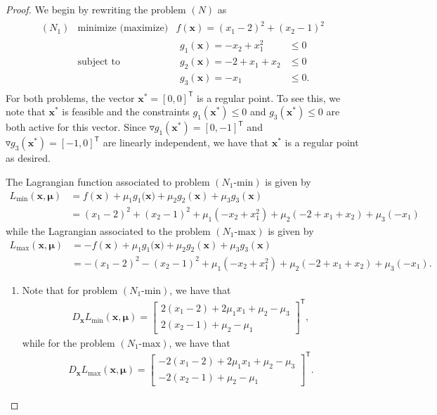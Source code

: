 \documentclass[12pt]{article}
\theoremstyle{definition}
\newcommand{\vc}[1]{\boldsymbol{#1}}
\newcommand{\tran}{\mathsf{T}}
\begin{document}
\begin{proof}
  We begin by rewriting the problem $(N)$ as
  \begin{align*}
    \begin{array}{rll}
      (N_1) & \text{minimize $($maximize$)$} & f(\vc{x}) =(x_1 - 2)^2 + (x_2 -1)^2 \\
      & \text{subject to} &
      \begin{array}{ll}
        g_1(\vc{x}) = -x_2 + x_1^2 &\leq 0\\
        g_2(\vc{x}) = -2 + x_1 + x_2 &\leq 0 \\
        g_3(\vc{x}) = -x_1 &\leq 0.
      \end{array}
    \end{array}
  \end{align*}
  For both problems, the vector $\vc{x}^*=[0,0]^\tran$ is a regular point. To see this, we note that
  $\vc{x}^*$ is feasible and the constraints $g_1(\vc{x}^*)\leq 0$ and $g_3(\vc{x}^*) \leq 0$ are both active for this vector. Since
  $\triangledown g_1(\vc{x}^*) = [0,-1]^\tran$ and $\triangledown g_3(\vc{x}^*) = [-1,0]^\tran$ are linearly independent,
  we have that $\vc{x}^*$ is a regular point as desired.

  The Lagrangian function associated to problem $(N_1\text{-min})$ is given by
  \begin{align*}
    L_{\min}(\vc{x}, \vc{\mu}) &= f(\vc{x}) + \mu_1g_1(\vc{x)} + \mu_2 g_2(\vc{x}) +\mu_3 g_3(\vc{x})\\
    &= (x_1 - 2)^2 + (x_2 -1)^2 + \mu_1(-x_2 + x_1^2) + \mu_2(-2 + x_1 + x_2) + \mu_3(-x_1)
  \end{align*}
  while the Lagrangian associated to the problem $(N_1\text{-max})$ is given by
  \begin{align*}
    L_{\max}(\vc{x}, \vc{\mu}) &= -f(\vc{x}) + \mu_1g_1(\vc{x)} + \mu_2 g_2(\vc{x}) +\mu_3 g_3(\vc{x})\\
    &= -(x_1 - 2)^2 - (x_2 -1)^2 + \mu_1(-x_2 + x_1^2) + \mu_2(-2 + x_1 + x_2) + \mu_3(-x_1).
  \end{align*}

  \begin{enumerate}
    \item Note that for problem $(N_1\text{-min})$, we have that
      \begin{align*}
        D_{\vc{x}}L_{\min}(\vc{x}, \vc{\mu}) =
        \begin{bmatrix}
          2 (x_1-2)+ 2\mu_1 x_1 + \mu_2 -\mu_3\\
          2 (x_2 - 1) + \mu_2 -\mu_1
        \end{bmatrix}^\tran,
      \end{align*}
      while for the problem $(N_1\text{-max})$, we have that
      \begin{align*}
        D_{\vc{x}}L_{\max}(\vc{x}, \vc{\mu}) =
        \begin{bmatrix}
          -2 (x_1-2)+ 2\mu_1 x_1 + \mu_2 -\mu_3 \\
          -2 (x_2 - 1) + \mu_2 -\mu_1
        \end{bmatrix}^\tran.
      \end{align*}


\end{enumerate}
\end{proof}
\end{document}

